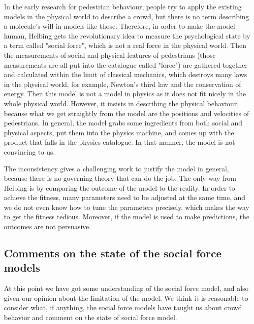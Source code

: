 In the early research for pedestrian behaviour, people try to apply the existing 
models in the physical world to describe a crowd, but there is no term describing 
a molecule's will in models like those. Therefore, in order to make the model 
human, Helbing gets the revolutionary idea to measure the psychological state 
by a term called "social force", which is not a real force in the physical world. 
\cite{social-force} Then the measurements of social and physical features 
of pedestrians (those measurements are all put into the catalogue called "force") 
are gathered together and calculated within the limit of classical mechanics, 
which destroys many laws in the physical world, for example, Newton's third law 
and the conservation of energy. Then this model is not a model in physics as 
it does not fit nicely in the whole physical world. However, it insists in describing 
the physical behaviour, because what we get straightly from the model are 
the positions and velocities of pedestrians. In general, the model grabs some 
ingredients from both social and physical aspects, put them into the physics 
machine, and comes up with the product that falls in the physics catalogue. 
In that manner, the model is not convincing to us.

The inconsistency gives a challenging work to justify the model in general, 
because there is no governing theory that can do the job. The only way from Helbing 
is by comparing the outcome of the model to the reality. In order to achieve the 
fitness, many parameters need to be adjusted at the same time, and we do not 
even know how to tune the parameters precisely, which makes the way to 
get the fitness tedious. Moreover, if the model is used to make predictions, the
outcomes are not persuasive. 

\subsection{Comments on the state of the social force models}
At this point we have got some understanding of the social force model, and 
also given our opinion about the limitation of the model. We think it is 
reasonable to consider what, if anything, the social force models have taught 
us about crowd behavior and comment on the state of social force model. 

